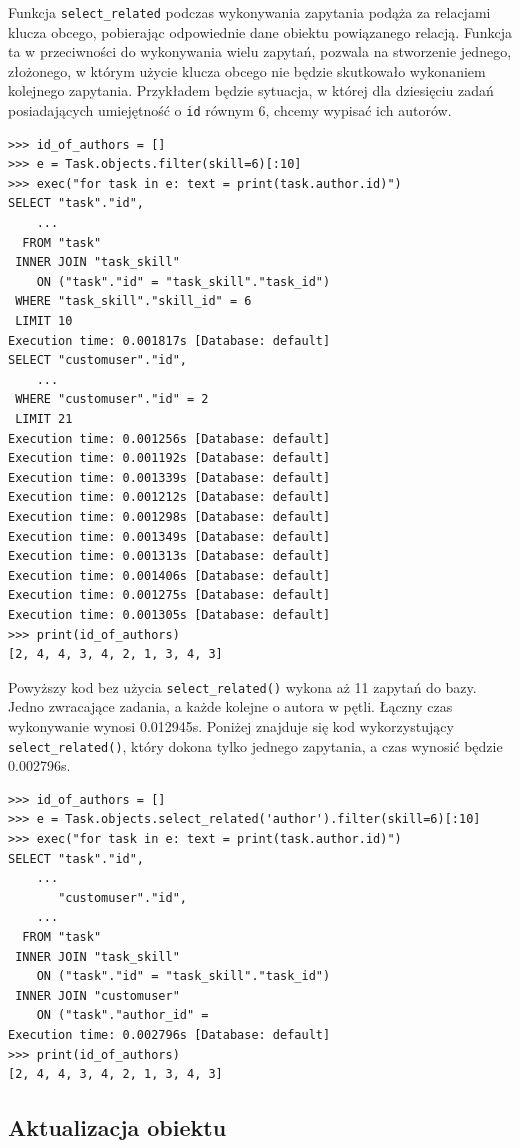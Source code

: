\documentclass[oneside,polski,logo,indent]{amuthesis}
\begin{document}
Funkcja \texttt{select\_related} podczas wykonywania zapytania podąża za relacjami klucza obcego, pobierając odpowiednie dane obiektu powiązanego relacją.
Funkcja ta w przeciwności do wykonywania wielu zapytań, pozwala na stworzenie jednego, złożonego, w którym użycie klucza obcego nie będzie skutkowało wykonaniem kolejnego zapytania. Przykładem będzie sytuacja, w której dla dziesięciu zadań posiadających umiejętność o \texttt{id} równym 6, chcemy wypisać ich autorów.
\begin{lstlisting}[style=DOS]
>>> id_of_authors = []
>>> e = Task.objects.filter(skill=6)[:10]
>>> exec("for task in e: text = print(task.author.id)")
SELECT "task"."id",
	...
  FROM "task"
 INNER JOIN "task_skill"
    ON ("task"."id" = "task_skill"."task_id")
 WHERE "task_skill"."skill_id" = 6
 LIMIT 10
Execution time: 0.001817s [Database: default]
SELECT "customuser"."id",
	...
 WHERE "customuser"."id" = 2
 LIMIT 21
Execution time: 0.001256s [Database: default]
Execution time: 0.001192s [Database: default]
Execution time: 0.001339s [Database: default]
Execution time: 0.001212s [Database: default]
Execution time: 0.001298s [Database: default]
Execution time: 0.001349s [Database: default]
Execution time: 0.001313s [Database: default]
Execution time: 0.001406s [Database: default]
Execution time: 0.001275s [Database: default]
Execution time: 0.001305s [Database: default]
>>> print(id_of_authors)
[2, 4, 4, 3, 4, 2, 1, 3, 4, 3]
\end{lstlisting}
Powyższy kod bez użycia \texttt{select\_related()} wykona aż 11 zapytań do bazy. Jedno zwracające zadania, a każde kolejne o autora w pętli. Łączny czas wykonywanie wynosi 0.012945s. Poniżej znajduje się kod wykorzystujący \texttt{select\_related()}, który dokona tylko jednego zapytania, a czas wynosić będzie 0.002796s.
\begin{lstlisting}[style=DOS]
>>> id_of_authors = []
>>> e = Task.objects.select_related('author').filter(skill=6)[:10]
>>> exec("for task in e: text = print(task.author.id)")
SELECT "task"."id",
	...
       "customuser"."id",
	...
  FROM "task"
 INNER JOIN "task_skill"
    ON ("task"."id" = "task_skill"."task_id")
 INNER JOIN "customuser"
    ON ("task"."author_id" =
Execution time: 0.002796s [Database: default]
>>> print(id_of_authors)
[2, 4, 4, 3, 4, 2, 1, 3, 4, 3]
\end{lstlisting}

\begin{center}
\subsection{Aktualizacja obiektu}
\end{center}
\end{document}

